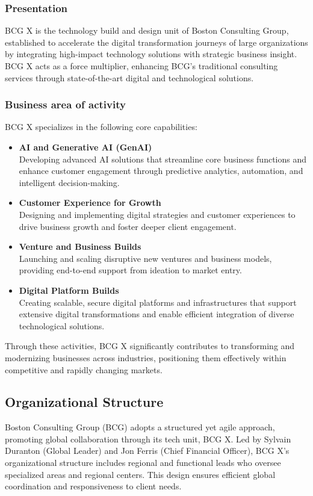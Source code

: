 \subsubsection{Presentation}
BCG X is the technology build and design unit of Boston Consulting Group, established to accelerate the digital transformation journeys of large organizations by integrating high-impact technology solutions with strategic business insight. BCG X acts as a force multiplier, enhancing BCG’s traditional consulting services through state-of-the-art digital and technological solutions.

\subsubsection{Business area of activity}
BCG X specializes in the following core capabilities:
\begin{itemize}
    \item \textbf{AI and Generative AI (GenAI) }\\
        Developing advanced AI solutions that streamline core business functions and enhance customer engagement through predictive analytics, automation, and intelligent decision-making.
    \item \textbf{Customer Experience for Growth }\\
        Designing and implementing digital strategies and customer experiences to drive business growth and foster deeper client engagement.
    \item \textbf{Venture and Business Builds }\\
        Launching and scaling disruptive new ventures and business models, providing end-to-end support from ideation to market entry.
    \item \textbf{Digital Platform Builds }\\
        Creating scalable, secure digital platforms and infrastructures that support extensive digital transformations and enable efficient integration of diverse technological solutions.
\end{itemize}

Through these activities, BCG X significantly contributes to transforming and modernizing businesses across industries, positioning them effectively within competitive and rapidly changing markets.

\subsection{Organizational Structure}
Boston Consulting Group (BCG) adopts a structured yet agile approach, promoting global collaboration through its tech unit, BCG X. Led by Sylvain Duranton (Global Leader) and Jon Ferris (Chief Financial Officer), BCG X’s organizational structure includes regional and functional leads who oversee specialized areas and regional centers. This design ensures efficient global coordination and responsiveness to client needs.\mynewline

